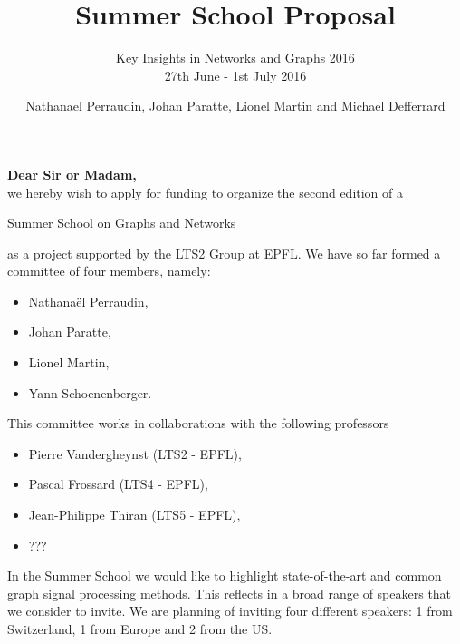 \documentclass[a4paper]{scrartcl}
\begin{document}
\title{Summer School Proposal}
\subtitle{Key Insights in Networks and Graphs 2016 \\ 27th June - 1st July 2016}

\author{Nathanael Perraudin, Johan Paratte, Lionel Martin and Michael Defferrard}

\maketitle



\vspace{2cm}


{\bf{Dear Sir or Madam,}} \\
we hereby wish to apply for funding to organize the second edition of a
\begin{large}
\begin{center}
Summer School on Graphs and Networks
\end{center}
\end{large}
as a project supported by the LTS2 Group at EPFL. We have so far formed a committee of four members, namely:
\begin{itemize}
	\item Nathanaël Perraudin,
	\item Johan Paratte, 
	\item Lionel Martin,
	\item Yann Schoenenberger.
\end{itemize}

This committee works in collaborations with the following professors
\begin{itemize}
	\item Pierre Vandergheynst (LTS2 - EPFL),
	\item Pascal Frossard (LTS4 - EPFL),
	\item Jean-Philippe Thiran (LTS5 - EPFL),
	\item ???
\end{itemize}

In the Summer School we would like to highlight state-of-the-art and common graph signal processing methods. This reflects in a broad range of speakers that we consider to invite. We are planning of inviting four different speakers: 1 from Switzerland, 1 from Europe and 2 from the US.

\vspace{0.5cm}
\end{document}
